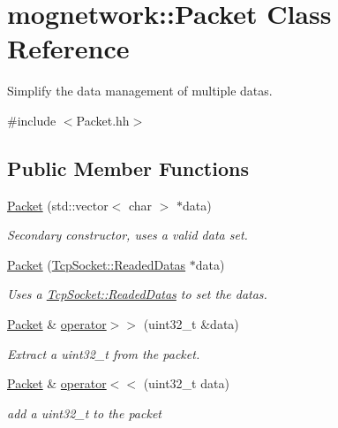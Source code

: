 \hypertarget{classmognetwork_1_1_packet}{\section{mognetwork\-:\-:Packet Class Reference}
\label{classmognetwork_1_1_packet}
}


Simplify the data management of multiple datas.  




{\ttfamily \#include $<$Packet.\-hh$>$}

\subsection*{Public Member Functions}
\begin{DoxyCompactItemize}
\item 
\hyperlink{classmognetwork_1_1_packet_ad3fd2055862e5dcd730f1ba6131fd51d}{Packet} (std\-::vector$<$ char $>$ $\ast$data)
\begin{DoxyCompactList}\small\item\em Secondary constructor, uses a valid data set. \end{DoxyCompactList}\item 
\hyperlink{classmognetwork_1_1_packet_acdb587026d9191583a7c71398f3c2535}{Packet} (\hyperlink{structmognetwork_1_1_tcp_socket_1_1_readed_datas}{Tcp\-Socket\-::\-Readed\-Datas} $\ast$data)
\begin{DoxyCompactList}\small\item\em Uses a \hyperlink{structmognetwork_1_1_tcp_socket_1_1_readed_datas}{Tcp\-Socket\-::\-Readed\-Datas} to set the datas. \end{DoxyCompactList}\item 
\hyperlink{classmognetwork_1_1_packet}{Packet} \& \hyperlink{classmognetwork_1_1_packet_a83f88dde9175ac8b47ec9a5d28635283}{operator$>$$>$} (uint32\-\_\-t \&data)
\begin{DoxyCompactList}\small\item\em Extract a uint32\-\_\-t from the packet. \end{DoxyCompactList}\item 
\hyperlink{classmognetwork_1_1_packet}{Packet} \& \hyperlink{classmognetwork_1_1_packet_a0ec841b42fafcd48aa4ac2d54fea6177}{operator$<$$<$} (uint32\-\_\-t data)
\begin{DoxyCompactList}\small\item\em add a uint32\-\_\-t to the packet \end{DoxyCompactList}\item 

\end{DoxyCompactItemize}
